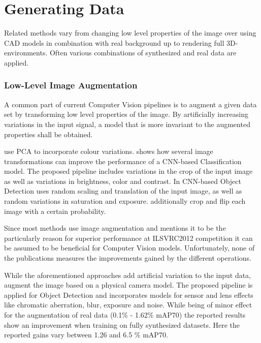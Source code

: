 \section{Generating Data}
\label{sec:training:related}

Related methods vary from changing low level properties of the image over using CAD models in combination with real background up to rendering full 3D-environments. Often various combinations of synthesized and real data are applied. 

\subsubsection{Low-Level Image Augmentation}

A common part of current Computer Vision pipelines is to augment a given data set by transforming low level properties of the image. By artificially increasing variations in the input signal, a model that is more invariant to the augmented properties shall be obtained.

\citeauthor{Krizhevsky2012a} \cite{Krizhevsky2012a} use \ac{PCA} to incorporate colour variations. \citeauthor{Howard2013} \cite{Howard2013} shows how several image transformations can improve the performance of a \ac{CNN}-based Classification model. The proposed pipeline includes variations in the crop of the input image as well as variations in brightness, color and contrast. In \ac{CNN}-based Object Detection \citeauthor{Redmon} \cite{Redmon} uses random scaling and translation of the input image, as well as random variations in saturation and exposure. \citeauthor{Liu} \cite{Liu} additionally crop and flip each image with a certain probability.

Since most methods use image augmentation and \citeauthor{Krizhevsky2012a} \cite{Krizhevsky2012a} mentions it to be the particularly reason for superior performance at ILSVRC2012 competition it can be assumed to be beneficial for Computer Vision models. Unfortunately, none of the publications measures the improvements gained by the different operations. 

While the aforementioned approaches add artificial variation to the input data, \citeauthor{Carlson2018}\cite{Carlson2018} augment the image based on a physical camera model. The proposed pipeline is applied for Object Detection and incorporates models for sensor and lens effects like chromatic aberration, blur, exposure and noise. While being of minor effect for the augmentation of real data (0.1\% - 1.62\% \ac{mAP}70) the reported results show an improvement when training on fully synthesized datasets. Here the reported gains vary between 1.26 and 6.5 \% \ac{mAP}70.

